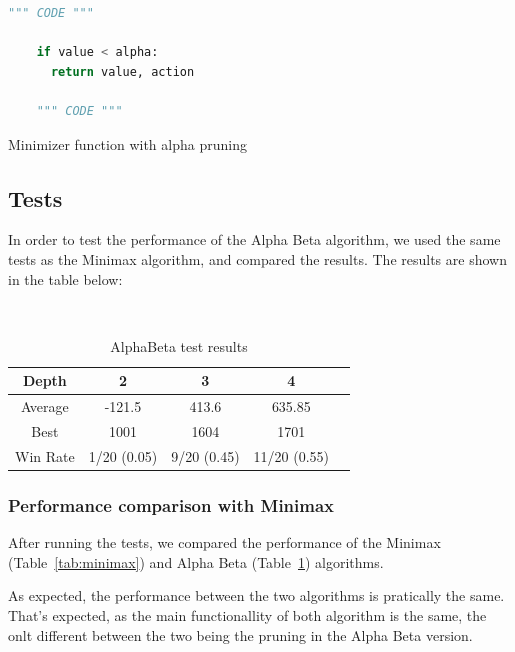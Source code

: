 \documentclass{article}
\begin{document}
\begin{table}[!ht]
  \begin{lstlisting}[language=python, frame=tlbr, framesep=6pt, backgroundcolor=\color{light-gray}]
    """ CODE """

    if value < alpha:
      return value, action

    """ CODE """
  \end{lstlisting}
  \caption{Minimizer function with alpha pruning}
\end{table}

\subsection{Tests}

In order to test the performance of the Alpha Beta algorithm, we used the same tests as the Minimax algorithm, and compared the results. The results are shown in the table below:

~\\
\begin{table}[!ht]
  \begin{center}
    \begin{tabular}{||c||c|c|c|c||}
      \hline
      Depth & 2 & 3 & 4 \\
      \hline\hline
      Average &  -121.5 &  413.6 &  635.85 \\
      \hline\hline
      Best & 1001 & 1604 & 1701 \\
      \hline\hline
      Win Rate & 1/20 (0.05) & 9/20 (0.45) & 11/20 (0.55) \\
      \hline
    \end{tabular}
    \caption{AlphaBeta test results}
    \label{tab:alphabeta}
  \end{center}
\end{table}

\subsubsection{Performance comparison with Minimax}
After running the tests, we compared the performance of the Minimax (Table~\ref{tab:minimax}) and Alpha Beta (Table~\ref{tab:alphabeta}) algorithms.

As expected, the performance between the two algorithms is pratically the same. That's expected, as the main functionallity of both algorithm is the same, the onlt different between the two being the pruning in the Alpha Beta version.
\end{document}
